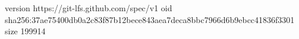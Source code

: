 version https://git-lfs.github.com/spec/v1
oid sha256:37ae75400db0a2c83f87b12bece843aea7deca8bbc7966d6b9ebcc41836f3301
size 199914
